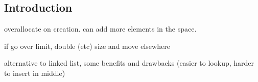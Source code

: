 
\subsection{Introduction}

overallocate on creation. can add more elements in the space.

if go over limit, double (etc) size and move elsewhere

alternative to linked list, some benefits and drawbacks (easier to lookup, harder to insert in middle)

